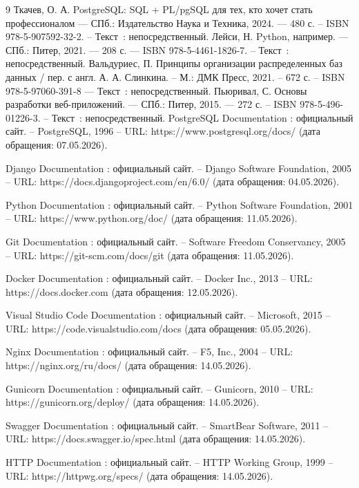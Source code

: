 \begin{thebibliography}{9}
    	Ткачев, О. А. PostgreSQL: SQL + PL/pgSQL для тех, кто хочет стать профессионалом — СПб.: Издательство Наука и Техника, 2024. — 480 с. -- ISBN 978-5-907592-32-2. -- Текст~: непосредственный.
	 Лейси, Н. Python, например. — СПб.: Питер, 2021. — 208 с. — ISBN 978-5-4461-1826-7. -- Текст~: непосредственный.
     Вальдуриес, П. Принципы организации распределенных баз данных / пер. с  англ. А. А. Слинкина. – М.: ДМК Пресс, 2021. – 672 с. -- ISBN 978-5-97060-391-8 — Текст~: непосредственный.
     Пьюривал, С. Основы разработки веб-приложений. — СПб.: Питер, 2015. — 272 с. -- ISBN 978-5-496-01226-3. -- Текст~: непосредственный. 
     PostgreSQL Documentation : официальный сайт. – PostgreSQL, 1996 – URL: https://www.postgresql.org/docs/ (дата обращения: 07.05.2026).

 Django Documentation : официальный сайт. – Django Software Foundation, 2005 – URL: https://docs.djangoproject.com/en/6.0/ (дата обращения: 04.05.2026).

 Python Documentation : официальный сайт. – Python Software Foundation, 2001 – URL: https://www.python.org/doc/ (дата обращения: 11.05.2026).

 Git Documentation : официальный сайт. – Software Freedom Conservancy, 2005 – URL: https://git-scm.com/docs/git (дата обращения: 11.05.2026).

 Docker Documentation : официальный сайт. – Docker Inc., 2013 – URL: https://docs.docker.com (дата обращения: 12.05.2026).

 Visual Studio Code Documentation : официальный сайт. – Microsoft, 2015 – URL: https://code.visualstudio.com/docs (дата обращения: 05.05.2026).

 Nginx Documentation : официальный сайт. – F5, Inc., 2004 – URL: https://nginx.org/ru/docs/ (дата обращения: 14.05.2026).

 Gunicorn Documentation : официальный сайт. – Gunicorn, 2010 – URL: https://gunicorn.org/deploy/ (дата обращения: 14.05.2026).

 Swagger Documentation : официальный сайт. – SmartBear Software, 2011 – URL: https://docs.swagger.io/spec.html (дата обращения: 14.05.2026).

 HTTP Documentation : официальный сайт. – HTTP Working Group, 1999 – URL: https://httpwg.org/specs/ (дата обращения: 14.05.2026).
\end{thebibliography}
